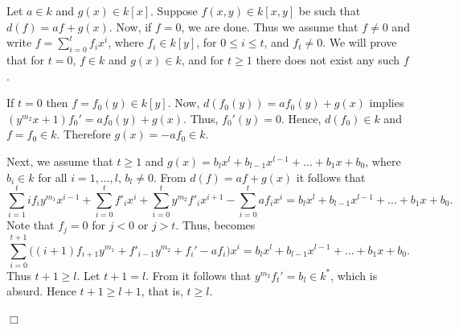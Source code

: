 \documentclass[12pt,reqno]{amsart}
\renewcommand{\leq}{\leqslant}
\renewcommand{\geq}{\geqslant}
\numberwithin{thm}{section}
\theoremstyle{definition}
\numberwithin{equation}{thm}
\renewenvironment{proof}{\par\noindent {\em Proof:}}{\hfill$\Box$\medskip}
\theoremstyle{plain}
\begin{document}
\begin{proof}
Let $a\in k$ and $g(x)\in k[x]$. Suppose $f(x,y)\in k[x,y]$ be such that $d(f)=af+g(x)$. Now, if $f=0$, we are done. Thus we assume that $f\neq 0$ and write $f=\sum_{i=0}^{t}f_ix^i$, where $f_i\in k[y]$, for $0\leq i\leq t$, and $f_t\neq 0$.  
	We will prove that for $t=0$, $f\in k$ and $g(x)\in k$, and for $t\geq 1$ there does not exist any such $f$.  
	
	If $t=0$ then $f=f_0(y)\in k[y]$. Now, $d(f_0(y))=af_0(y)+g(x)$ implies $(y^{m_2}x+1)f_0'=af_0(y)+g(x)$. Thus, $f_0'(y)=0$. Hence, $d(f_0)\in k$ and $f=f_0\in k$. Therefore $g(x)=-af_0\in k$.
	
	Next, we assume that $t\geq 1$ and $g(x)=b_lx^l+b_{l-1}x^{l-1}+\dots+b_1x+b_0$, where $b_i\in k$ for all $i=1,\ldots,l$, $b_l\neq 0$. From $d(f)=af+g(x)$ it follows that
	\begin{equation}\label{eqnzero}
		\sum_{i=1}^{t}if_iy^{m_1}x^{i-1}+\sum_{i=0}^{t}f'_ix^i+\sum_{i=0}^{t}y^{m_2}f'_ix^{i+1}-\sum_{i=0}^{t}af_ix^i= b_lx^l+b_{l-1}x^{l-1}+\dots+b_1x+b_0.
	\end{equation}
	Note that $f_j=0$ for $j<0$ or $j>t$. Thus,  becomes
	\begin{equation}\label{maineqn}
		\sum_{i=0}^{t+1}\bigg((i+1)f_{i+1}y^{m_1}+f'_{i-1}y^{m_2}+f_i'-af_i\bigg)x^i=b_lx^l+b_{l-1}x^{l-1}+\dots+b_1x+b_0.
	\end{equation}
	Thus $t+1\geq l$. Let $t+1=l$. From  it follows that $y^{m_2}f_t'=b_l\in k^{\ast}$, which is absurd. Hence $t+1\geq l+1$, that is, $t\geq l$. 
	

\end{proof}
\end{document}
